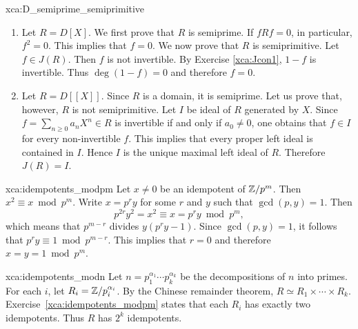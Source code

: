 \begin{sol}{xca:D_semiprime_semiprimitive}
\begin{enumerate}
    \item Let $R=D[X]$. We first prove that $R$ is semiprime. If $fRf=0$, in particular, 
    $f^2=0$. This implies that $f=0$. 
    We now prove that $R$ is semiprimitive. Let $f\in J(R)$. Then $f$ is not invertible. By Exercise \ref{xca:Jcon1}, $1-f$ is invertible. Thus $\deg(1-f)=0$ and therefore
    $f=0$. 

    \item Let $R=D[\![X]\!]$. Since $R$ is a domain, 
    it is semiprime. Let us prove that, however, $R$ is not
    semiprimitive. Let $I$ be ideal of $R$ 
    generated by $X$. 
    Since $f=\sum_{n\geq0}a_nX^n\in R$ is invertible if and only 
    if $a_0\ne 0$, one obtains that $f\in I$ for every non-invertible $f$. 
    This implies
    that every proper left ideal is contained in $I$. Hence 
    $I$ is the unique maximal left ideal of $R$. Therefore 
    $J(R)=I$. 
    \end{enumerate}
\end{sol}


\begin{sol}{xca:idempotents_modpm}
    Let $x\ne 0$ be an idempotent of $\mathbb{Z}/p^m$. Then $x^2\equiv x\bmod p^m$. 
    Write $x=p^ry$ for some $r$ and $y$ such that $\gcd(p,y)=1$. Then 
    \[
    p^{2r}y^2=x^2\equiv x=p^ry\bmod p^m,
    \]
    which means that $p^{m-r}$ divides $y(p^ry-1)$. Since 
    $\gcd(p,y)=1$, it follows that 
    $p^ry\equiv 1\bmod p^{m-r}$. This implies that $r=0$ and 
    therefore $x=y=1\bmod p^m$.
\end{sol}

\begin{sol}{xca:idempotents_modn}
    Let $n=p_1^{\alpha_1}\cdots p_k^{\alpha_k}$ be the decompositions 
    of $n$ into primes. For each $i$, let $R_i=\mathbb{Z}/p_i^{\alpha_i}$. By the 
    Chinese remainder theorem, $R\simeq R_1\times\cdots\times R_k$. Exercise~\ref{xca:idempotents_modpm} states that each $R_i$ has exactly  
    two idempotents. Thus $R$ has $2^k$ idempotents. 
\end{sol}

